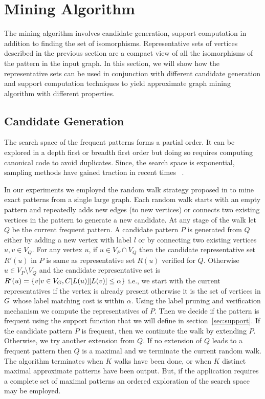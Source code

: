 \section{Mining Algorithm}
\label{sec:mining}
 The mining algorithm involves candidate generation, support computation in
 addition to finding the set of isomorphisms.  Representative sets of vertices
 described in the previous section are a compact view of all the isomorphisms of
 the pattern in the input graph. In this section, we will show how the
 representative sets can be used in conjunction with different candidate
 generation and support computation techniques to yield approximate graph mining
 algorithm with different properties.


\subsection{Candidate Generation} 

The search space of the frequent patterns forms a partial order.  It can be
explored in a depth first or breadth first order but doing so requires computing
canonical code to avoid duplicates. Since, the search space is exponential,
sampling methods have gained traction in recent
times~\cite{2008-origami:sadm,2009-graphsampling} . 


In our experiments we employed the random walk strategy proposed in
\cite{2011-icdm} to mine exact patterns from a single large graph. Each random
walk starts with an empty pattern and repeatedly adds new edges (to new
vertices) or connects two existing vertices in the pattern to generate a new
candidate. At any stage of the walk let $Q$ be the current frequent pattern.
A candidate pattern $P$ is generated from $Q$ either by adding a new vertex 
with label $l$ or by connecting two existing vertices $u, v \in V_Q$.
For any vertex $u$, if $u \in V_P \cap V_Q$ then the candidate representative set 
$R'(u)$ in $P$ is same as representative set $R(u)$ verified for $Q$. Otherwise
$u \in V_P \setminus V_Q$ and the candidate representative set is $R'(u) = \{ v
| v \in V_G, {C}[L(u)][L(v)] \leq \alpha \} $ i.e., we start with the
current representatives if the vertex is already present otherwise it is the set
of vertices in $G$ whose label matching cost is within $\alpha$. Using the
label pruning and verification mechanism we compute the representatives of $P$.
Then we decide if the pattern is frequent using the support function that we
will define in section~\ref{sec:support}. If the candidate pattern $P$ is
frequent, then we continute the walk by extending $P$. Otherwise, we  try
another extension from $Q$. If no extension of $Q$ leads to a frequent pattern
then $Q$ is a maximal and we terminate the current random walk.
The algorithm terminates when $K$ walks have been done, or when $K$
distinct maximal approximate patterns have been output. But, if the application
requires a complete set of maximal patterns an ordered exploration of the search
space may be employed.


